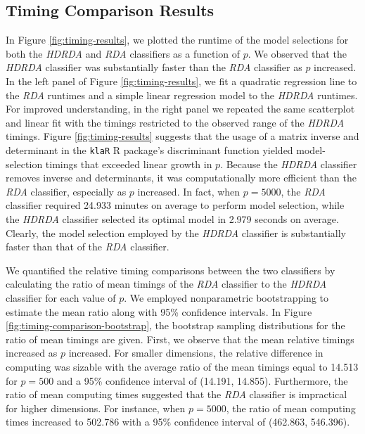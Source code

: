 \documentclass[]{interact}\usepackage[]{graphicx}\usepackage[]{color}
\begin{document}
\subsection{Timing Comparison Results}

In Figure \ref{fig:timing-results}, we plotted the runtime of the model
selections for both the \emph{HDRDA} and \emph{RDA} classifiers as a function of
$p$. We observed that the \emph{HDRDA} classifier was substantially faster than
the \emph{RDA} classifier as $p$ increased. In the left panel of Figure
\ref{fig:timing-results}, we fit a quadratic regression line to the \emph{RDA}
runtimes and a simple linear regression model to the \emph{HDRDA} runtimes.  For
improved understanding, in the right panel we repeated the same scatterplot and
linear fit with the timings restricted to the observed range of the \emph{HDRDA}
timings. Figure \ref{fig:timing-results} suggests that the usage of a matrix
inverse and determinant in the {\tt klaR} R package's discriminant function
yielded model-selection timings that exceeded linear growth in $p$. Because the
\emph{HDRDA} classifier removes inverse and determinants, it was computationally
more efficient than the \emph{RDA} classifier, especially as $p$ increased. In
fact, when $p = 5000$, the \emph{RDA} classifier required
24.933 minutes on average to perform model selection, while
the \emph{HDRDA} classifier selected its optimal model in
2.979 seconds on average. Clearly, the model selection
employed by the \emph{HDRDA} classifier is substantially faster than that of the
\emph{RDA} classifier.

We quantified the relative timing comparisons between the two classifiers by
calculating the ratio of mean timings of the \emph{RDA} classifier to the
\emph{HDRDA} classifier for each value of $p$. We employed nonparametric
bootstrapping to estimate the mean ratio along with 95\% confidence
intervals. In Figure \ref{fig:timing-comparison-bootstrap}, the bootstrap
sampling distributions for the ratio of mean timings are given. First, we
observe that the mean relative timings increased as $p$ increased. For smaller
dimensions, the relative difference in computing was sizable with the average
ratio of the mean timings equal to 14.513 for
$p = 500$ and a 95\% confidence interval of
(14.191,
14.855). Furthermore, the ratio of mean
computing times suggested that the \emph{RDA} classifier is impractical for
higher dimensions. For instance, when $p = 5000$, the ratio of mean computing
times increased to 502.786 with a 95\%
confidence interval of (462.863,
546.396).
\end{document}
